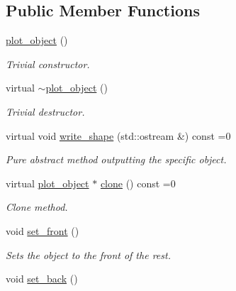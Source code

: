 \subsection*{Public Member Functions}
\begin{DoxyCompactItemize}
\item 
\hypertarget{a00429_a2fc9a8e4f8aee5c6e519c612b2d01ec8}{}\hyperlink{a00429_a2fc9a8e4f8aee5c6e519c612b2d01ec8}{plot\+\_\+object} ()\label{a00429_a2fc9a8e4f8aee5c6e519c612b2d01ec8}

\begin{DoxyCompactList}\small\item\em Trivial constructor. \end{DoxyCompactList}\item 
\hypertarget{a00429_a5d149a4f6f95cc2d7b3d11c611124b54}{}virtual \hyperlink{a00429_a5d149a4f6f95cc2d7b3d11c611124b54}{$\sim$plot\+\_\+object} ()\label{a00429_a5d149a4f6f95cc2d7b3d11c611124b54}

\begin{DoxyCompactList}\small\item\em Trivial destructor. \end{DoxyCompactList}\item 
\hypertarget{a00429_ae86f5349ad2f170c516fa800ffac1ba2}{}virtual void \hyperlink{a00429_ae86f5349ad2f170c516fa800ffac1ba2}{write\+\_\+shape} (std\+::ostream \&) const =0\label{a00429_ae86f5349ad2f170c516fa800ffac1ba2}

\begin{DoxyCompactList}\small\item\em Pure abstract method outputting the specific object. \end{DoxyCompactList}\item 
\hypertarget{a00429_ac8f493432ca28c639518e2a2d00eb0ce}{}virtual \hyperlink{a00429}{plot\+\_\+object} $\ast$ \hyperlink{a00429_ac8f493432ca28c639518e2a2d00eb0ce}{clone} () const =0\label{a00429_ac8f493432ca28c639518e2a2d00eb0ce}

\begin{DoxyCompactList}\small\item\em Clone method. \end{DoxyCompactList}\item 
\hypertarget{a00429_a46a47ea9f30e1e9ae8962777c4afd141}{}void \hyperlink{a00429_a46a47ea9f30e1e9ae8962777c4afd141}{set\+\_\+front} ()\label{a00429_a46a47ea9f30e1e9ae8962777c4afd141}

\begin{DoxyCompactList}\small\item\em Sets the object to the front of the rest. \end{DoxyCompactList}\item 
\hypertarget{a00429_ac3c24aea8746e470cd47a9f6bf9166b4}{}void \hyperlink{a00429_ac3c24aea8746e470cd47a9f6bf9166b4}{set\+\_\+back} ()\label{a00429_ac3c24aea8746e470cd47a9f6bf9166b4}


\end{DoxyCompactItemize}

